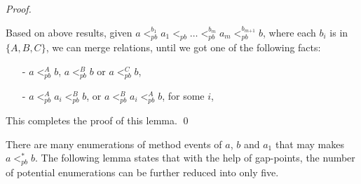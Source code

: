 \begin {proof}
\begin{itemize}
\end{itemize}

Based on above results, given $a <_{\textit{pb}}^{b_1} a_1 <_{\textit{pb}} \ldots <_{\textit{pb}}^{b_m} a_m <_{\textit{pb}}^{b_{\textit{m+1}}} b$, where each $b_i$ is in $\{ A,B,C \}$, we can merge relations, until we got one of the following facts:

\begin{itemize}
\setlength{\itemsep}{0.5pt}
\item[-] $a <_{\textit{pb}}^A b$, $a <_{\textit{pb}}^B b$ or $a <_{\textit{pb}}^C b$,

\item[-] $a <_{\textit{pb}}^A a_i <_{\textit{pb}}^B b$, or $a <_{\textit{pb}}^B a_i <_{\textit{pb}}^A b$, for some $i$,
\end{itemize}

This completes the proof of this lemma. \qed
\end {proof}

There are many enumerations of method events of $a$, $b$ and $a_1$ that may makes $a <_{\textit{pb}}^* b$. The following lemma states that with the help of gap-points, the number of potential enumerations can be further reduced into only five.

\FiveEnmuerationisEnoughForEPQOneEqual*

